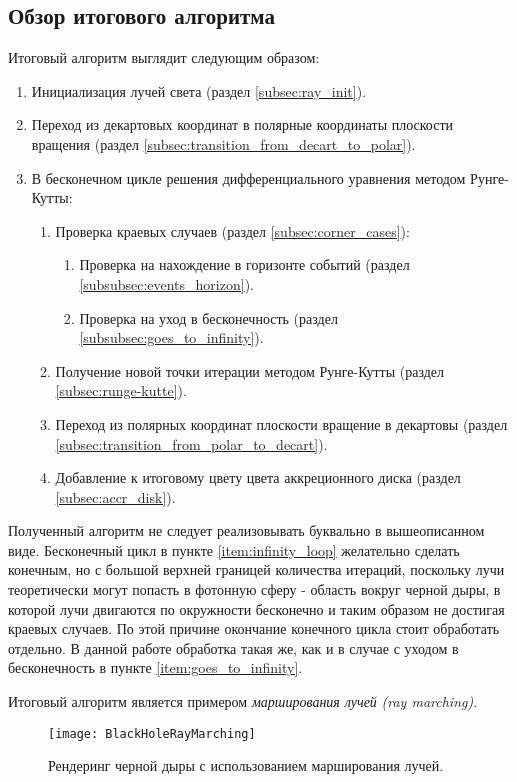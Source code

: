 \subsection{Обзор итогового алгоритма}
\label{subsec:algos}

Итоговый алгоритм выглядит следующим образом:

\begin{enumerate}
\label{enum:algos}
    \item Инициализация лучей света (раздел \ref{subsec:ray_init}).
    \item Переход из декартовых координат в полярные координаты плоскости вращения (раздел \ref{subsec:transition_from_decart_to_polar}).
    \item В бесконечном цикле решения дифференциального уравнения методом Рунге-Кутты:
    \label{item:infinity_loop}
    \begin{enumerate}
        \item Проверка краевых случаев (раздел \ref{subsec:corner_cases}):
        \begin{enumerate}
            \item Проверка на нахождение в горизонте событий (раздел \ref{subsubsec:events_horizon}).
            \item Проверка на уход в бесконечность (раздел \ref{subsubsec:goes_to_infinity}).
            \label{item:goes_to_infinity}
        \end{enumerate}
        \item Получение новой точки итерации методом Рунге-Кутты (раздел \ref{subsec:runge-kutte}).
        \item Переход из полярных координат плоскости вращение в декартовы (раздел \ref{subsec:transition_from_polar_to_decart}).
        \item Добавление к итоговому цвету цвета аккреционного диска (раздел \ref{subsec:accr_disk}).
    \end{enumerate}
\end{enumerate}

Полученный алгоритм не следует реализовывать буквально в вышеописанном виде. Бесконечный цикл в пункте \ref{item:infinity_loop} желательно сделать конечным, но с большой верхней границей количества итераций, поскольку лучи теоретически могут попасть в фотонную сферу - область вокруг черной дыры, в которой лучи двигаются по окружности бесконечно и таким образом не достигая краевых случаев. По этой причине окончание конечного цикла стоит обработать отдельно. В данной работе обработка такая же, как и в случае с уходом в бесконечность в пункте \ref{item:goes_to_infinity}.

Итоговый алгоритм является примером \textit{марширования лучей} \linebreak\textit{(ray marching)}.

\begin{figure}[h]
    \centering
    \texttt{[image: BlackHoleRayMarching]}
    \caption{Рендеринг черной дыры с использованием марширования лучей.}
    \label{fig:black_hole_ray_marching}
\end{figure}

\newpage
